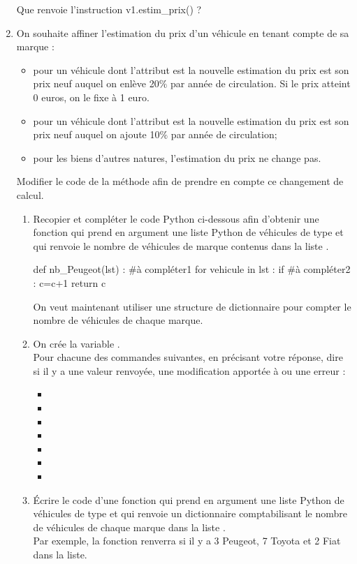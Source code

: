 \documentclass[11pt,a4paper,french,twoside]{PMCours}
\begin{document}
\begin{enumerate}
Que renvoie l'instruction v1.estim\_prix() ? 
\item On souhaite affiner l'estimation du prix d'un véhicule en tenant compte de sa marque :
\begin{itemize}
\item pour un véhicule dont l'attribut  est  la nouvelle estimation du prix est son prix neuf auquel on enlève 20$\%$ par année de circulation. Si le prix atteint $0$ euros, on le fixe à 1 euro. 
\item pour un véhicule dont l'attribut  est  la nouvelle estimation du prix est son prix neuf auquel on ajoute 10$\%$ par année de circulation; 
\item pour les biens d'autres natures, l'estimation du prix ne change pas.
\end{itemize}
Modifier le code de la méthode  afin de prendre en compte ce changement
de calcul.
\begin{enumerate} 
\item Recopier et compléter le code Python ci-dessous afin d'obtenir une fonction  qui prend en argument une liste Python de véhicules de type  et qui renvoie le nombre de véhicules de marque  contenus dans la liste .
\begin{Python}
def nb_Peugeot(lst) : 
	#à compléter1
	for vehicule in lst : 
		if #à compléter2 :
			c=c+1
	return c
\end{Python}
On veut maintenant utiliser une structure de dictionnaire pour compter le nombre de véhicules de chaque marque.
\item On crée la variable .\\
Pour chacune des commandes suivantes, en précisant votre réponse, dire si il y a une valeur renvoyée, une modification apportée à  ou une erreur : 
\begin{itemize} 
\item {}
\item {}
\item {}
\item {}
\item {}
\item {}
\item {}
\end{itemize} 
\item Écrire le code d'une fonction  qui prend en argument une liste Python de véhicules de type  et qui renvoie un dictionnaire comptabilisant le nombre de véhicules de chaque marque dans la liste .\\
Par exemple, la fonction renverra  si il y a 3 Peugeot, 7 Toyota et 2 Fiat dans la liste.
\end{enumerate}    


\end{enumerate}
\end{document}
